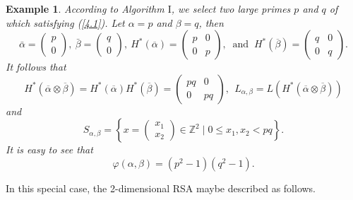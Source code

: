 \documentclass [11pt]{article}
\newtheorem{example}[thm]{\bf{Example}}
\begin{document}
\begin{example}
According to Algorithm $\mathrm{I}$, we select two large primes $p$ and $q$ of which satisfying (\ref{4.1}). Let $\alpha=p$ and $\beta=q$, then
$$
\bar{\alpha}=\left(\begin{array}{l}
p \\
0
\end{array}\right),\  \bar{\beta}=\left(\begin{array}{l}
q \\
0
\end{array}\right),  \  H^{*}(\overline{\alpha})=\left(\begin{array}{ll}
p & 0 \\
0 & p
\end{array}\right),\  \text { and }\  H^{*}(\overline{\beta})=\left(\begin{array}{ll}
q & 0 \\
0 & q
\end{array}\right).
$$
It follows that
\begin{equation}\label{4.2}
H^{*}( \overline{\alpha} \otimes \overline{\beta})= H^{*}( \overline{\alpha} )H^{*}( \overline{\beta} )=\left(\begin{matrix}
pq&0\\
0&pq
\end{matrix}\right),\ \ L_{\alpha,\beta}=L\left(H^{*}( \overline{\alpha} \otimes \overline{\beta}) \right)
\end{equation}
and
\begin{equation}\label{4.3}
S_{\alpha, \beta}=\left\{ x=\left(\begin{matrix}
x_{1}\\
x_{2}
\end{matrix}\right) \in \mathbb{Z}^{2}\mid 0\leq x_{1}, x_{2} <pq \right\}.
\end{equation}
It is easy to see that
\begin{equation}\label{4.4}
\varphi(\alpha,\beta)=(p^{2}-1)(q^{2}-1).
\end{equation}
\end{example}

In this  special case, the 2-dimensional RSA maybe described as follows.
\end{document}
